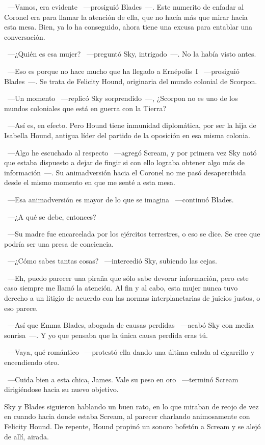 ~---Vamos, era evidente ~---prosiguió Blades~---. Este numerito de enfadar al Coronel era para llamar la atención de ella, que no hacía más que mirar hacia esta mesa. Bien, ya lo ha conseguido, ahora tiene una excusa para entablar una conversación.

~---¿Quién es esa mujer? ~---preguntó Sky, intrigado~---. No la había visto antes.

~---Eso es porque no hace mucho que ha llegado a Ernépolis~I ~---prosiguió Blades~---. Se trata de Felicity Hound, originaria del mundo colonial de Scorpon.

~---Un momento ~---replicó Sky sorprendido~---, ¿Scorpon no es uno de los mundos coloniales que está en guerra con la Tierra?

~---Así es, en efecto. Pero Hound tiene inmunidad diplomática, por ser la hija de Isabella Hound, antigua líder del partido de la oposición en esa misma colonia.

~---Algo he escuchado al respecto ~---agregó Scream, y por primera vez Sky notó que estaba dispuesto a dejar de fingir si con ello lograba obtener algo más de información~---. Su animadversión hacia el Coronel no me pasó desapercibida desde el mismo momento en que me senté a esta mesa.

~---Esa animadversión es mayor de lo que se imagina ~---continuó Blades.

~---¿A qué se debe, entonces?

~---Su madre fue encarcelada por los ejércitos terrestres, o eso se dice. Se cree que podría ser una presa de conciencia.

~---¿Cómo sabes tantas cosas? ~---intercedió Sky, subiendo las cejas.

~---Eh, puedo parecer una piraña que sólo sabe devorar información, pero este caso siempre me llamó la atención. Al fin y al cabo, esta mujer nunca tuvo derecho a un litigio de acuerdo con las normas interplanetarias de juicios justos, o eso parece.

~---Así que Emma Blades, abogada de causas perdidas ~---acabó Sky con media sonrisa~---. Y yo que pensaba que la única causa perdida eras tú.

~---Vaya, qué romántico ~---protestó ella dando una última calada al cigarrillo y encendiendo otro.

~---Cuida bien a esta chica, James. Vale su peso en oro ~---terminó Scream dirigiéndose hacia su nuevo objetivo.

Sky y Blades siguieron hablando un buen rato, en lo que miraban de reojo de vez en cuando hacia donde estaba Scream, al parecer charlando animosamente con Felicity Hound. De repente, Hound propinó un sonoro bofetón a Scream y se alejó de allí, airada.

